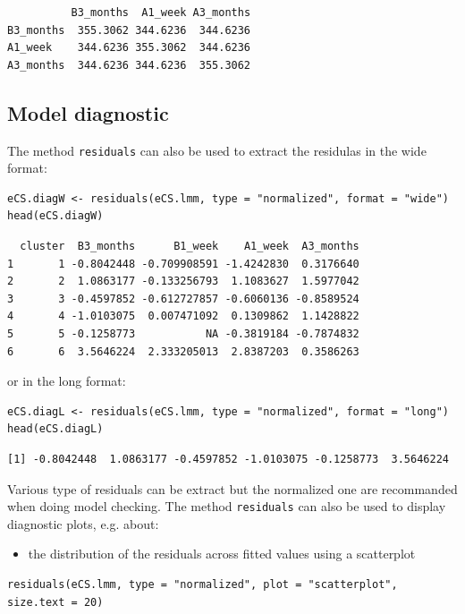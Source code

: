 \documentclass[12pt]{article}
\begin{document}
\begin{verbatim}
          B3_months  A1_week A3_months
B3_months  355.3062 344.6236  344.6236
A1_week    344.6236 355.3062  344.6236
A3_months  344.6236 344.6236  355.3062
\end{verbatim}


\clearpage

\subsection{Model diagnostic}
\label{sec:orgf96a07f}

The method \texttt{residuals} can also be used to extract the residulas in
the wide format:
\lstset{language=r,label= ,caption= ,captionpos=b,numbers=none}
\begin{lstlisting}
eCS.diagW <- residuals(eCS.lmm, type = "normalized", format = "wide")
head(eCS.diagW)
\end{lstlisting}

\begin{verbatim}
  cluster  B3_months      B1_week    A1_week  A3_months
1       1 -0.8042448 -0.709908591 -1.4242830  0.3176640
2       2  1.0863177 -0.133256793  1.1083627  1.5977042
3       3 -0.4597852 -0.612727857 -0.6060136 -0.8589524
4       4 -1.0103075  0.007471092  0.1309862  1.1428822
5       5 -0.1258773           NA -0.3819184 -0.7874832
6       6  3.5646224  2.333205013  2.8387203  0.3586263
\end{verbatim}


or in the long format:
\lstset{language=r,label= ,caption= ,captionpos=b,numbers=none}
\begin{lstlisting}
eCS.diagL <- residuals(eCS.lmm, type = "normalized", format = "long")
head(eCS.diagL)
\end{lstlisting}

\begin{verbatim}
[1] -0.8042448  1.0863177 -0.4597852 -1.0103075 -0.1258773  3.5646224
\end{verbatim}


Various type of residuals can be extract but the normalized one are
recommanded when doing model checking. The method \texttt{residuals} can also
be used to display diagnostic plots, e.g. about:
\begin{itemize}
\item the distribution of the residuals across fitted values using a
scatterplot
\end{itemize}
\lstset{language=r,label= ,caption= ,captionpos=b,numbers=none}
\begin{lstlisting}
residuals(eCS.lmm, type = "normalized", plot = "scatterplot", size.text = 20)
\end{lstlisting}
\end{document}
